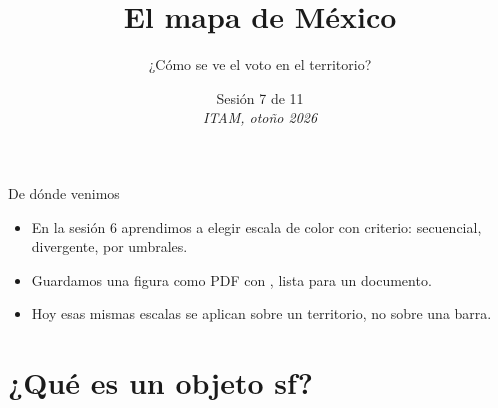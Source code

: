 %



\title[Lab de R · Sesión 7]{El mapa de México}
\subtitle{¿Cómo se ve el voto en el territorio?}
\date{%
  Sesión 7 de 11\\[0.3em]
  \textit{ITAM, otoño 2026}%
}



{
\begin{frame}
  \titlepage
\end{frame}}


\begin{frame}{De dónde venimos}
  \vspace{0.3em}
  \begin{itemize}\setlength{\itemsep}{0.9em}
    \item<1-> En la sesión 6 aprendimos a elegir escala de color con
          criterio: secuencial, divergente, por umbrales.
    \item<2-> Guardamos una figura como PDF con , lista
          para un documento.
    \item<3-> Hoy esas mismas escalas se aplican sobre un territorio,
          no sobre una barra.
  \end{itemize}
\end{frame}

\section{¿Qué es un objeto sf?}


